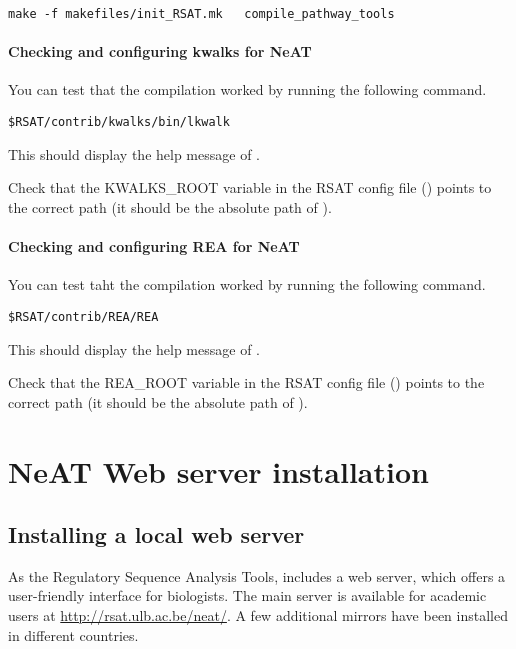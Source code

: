 \documentclass{book}
\begin{document}
\begin{lstlisting}
make -f makefiles/init_RSAT.mk   compile_pathway_tools
\end{lstlisting}

\subsubsection{Checking and configuring kwalks for NeAT}

You can test that the compilation worked by running the following
command.

\begin{lstlisting}
$RSAT/contrib/kwalks/bin/lkwalk
\end{lstlisting}

This should display the help message of .

Check that the KWALKS\_ROOT variable in the RSAT config file
() points to the correct path (it
should be the absolute path of ).

\subsubsection{Checking and configuring REA for NeAT}

You can test taht the compilation worked by running the following
command.

\begin{lstlisting}
$RSAT/contrib/REA/REA
\end{lstlisting}

This should display the help message of .

Check that the REA\_ROOT variable in the RSAT config file
() points to the correct path (it
should be the absolute path of ).

\chapter{NeAT Web server installation}
\section{Installing a local web server}

As the Regulatory Sequence Analysis Tools, \neat includes a web
server, which offers a user-friendly interface for biologists. The
main server is available for academic users at
\url{http://rsat.ulb.ac.be/neat/}. A few additional mirrors have been
installed in different countries.
\end{document}
